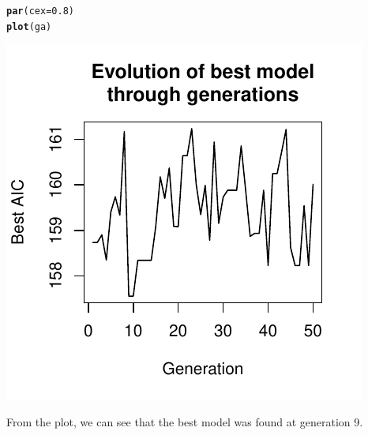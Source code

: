\documentclass{article}\usepackage[]{graphicx}\usepackage[]{color}
\makeatletter
\def\maxwidth{ %
  \ifdim\Gin@nat@width>\linewidth
    \linewidth
  \else
    \Gin@nat@width
  \fi
}
\newcommand{\hlnum}[1]{\textcolor[rgb]{0.686,0.059,0.569}{#1}}%
\newcommand{\hlstd}[1]{\textcolor[rgb]{0.345,0.345,0.345}{#1}}%
\newcommand{\hlkwc}[1]{\textcolor[rgb]{0.333,0.667,0.333}{#1}}%
\newcommand{\hlkwd}[1]{\textcolor[rgb]{0.737,0.353,0.396}{\textbf{#1}}}%
\newenvironment{kframe}{%
 \def\at@end@of@kframe{}%
 \ifinner\ifhmode%
  \def\at@end@of@kframe{\end{minipage}}%
  \begin{minipage}{\columnwidth}%
 \fi\fi%
 \def\FrameCommand##1{\hskip\@totalleftmargin \hskip-\fboxsep
 \colorbox{shadecolor}{##1}\hskip-\fboxsep
     \hskip-\linewidth \hskip-\@totalleftmargin \hskip\columnwidth}%
 \MakeFramed {\advance\hsize-\width
   \@totalleftmargin\z@ \linewidth\hsize
   \@setminipage}}%
 {\par\unskip\endMakeFramed%
 \at@end@of@kframe}
\newenvironment{knitrout}{}{} %
\makeatother
\begin{document}
\begin{knitrout}
\color{fgcolor}\begin{kframe}
\begin{alltt}
\hlkwd{par}\hlstd{(}\hlkwc{cex} \hlstd{=} \hlnum{0.8}\hlstd{)}
\hlkwd{plot}\hlstd{(ga)}
\end{alltt}
\end{kframe}
\includegraphics[width=\maxwidth]{figure/latex-unnamed-chunk-4} 

\end{knitrout}

From the plot, we can see that the best model was found at generation 9. 
\end{document}
